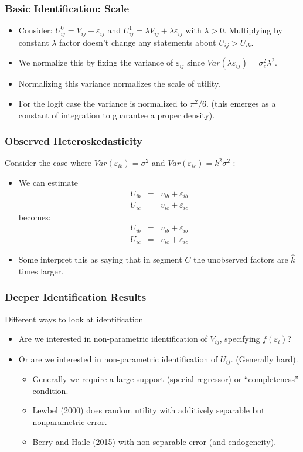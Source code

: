 \begin{frame}
\frametitle{Basic Identification: Scale}
\begin{itemize}
\item Consider: $U_{ij}^0 = V_{ij} + \varepsilon_{ij}$ and  $U_{ij}^1 = \lambda V_{ij} + \lambda \varepsilon_{ij}$ with $\lambda > 0$. Multiplying by constant $\lambda$ factor doesn't change any statements about $U_{ij} > U_{ik}$.
\item We normalize this by fixing the variance of $\varepsilon_{ij}$ since $Var(\lambda \varepsilon_{ij} ) = \sigma_e^2 \lambda^2$.
\item Normalizing this variance normalizes the scale of utility.
\item For the logit case the variance is normalized to $\pi^2/6$. (this emerges as a constant of integration to guarantee a proper density).
\end{itemize}
\end{frame}



\begin{frame}
\frametitle{Observed Heteroskedasticity}
Consider the case where $Var(\varepsilon_{ib}) = \sigma^2$ and   $Var(\varepsilon_{ic}) =  k^2 \sigma^2$ :
\begin{itemize}
\item We can estimate
\begin{eqnarray*}
U_{ib} &=& v_{ib}+ \varepsilon_{ib}\\
U_{ic} &=& v_{ic}+ \varepsilon_{ic}
\end{eqnarray*}
becomes:
\begin{eqnarray*}
U_{ib} &=& v_{ib}+ \varepsilon_{ib}\\
U_{ic} &=& v_{ic}+ \varepsilon_{ic}
\end{eqnarray*}
\item Some interpret this as saying that in segment $C$ the unobserved factors are $\hat{k}$ times larger.
\end{itemize}
\end{frame}

\begin{frame}
\frametitle{Deeper Identification Results}
Different ways to look at identification
\begin{itemize}
\item Are we interested in non-parametric identification of $V_{ij}$, specifying $f(\varepsilon_i)$?
\item Or are we interested in non-parametric identification of $U_{ij}$. (Generally hard).
\begin{itemize}
\item Generally we require a large support (special-regressor) or ``completeness'' condition.
\item Lewbel (2000) does random utility with additively separable but nonparametric error.\item Berry and Haile (2015) with non-separable error (and endogeneity).
\end{itemize}
\end{itemize}
\end{frame}


